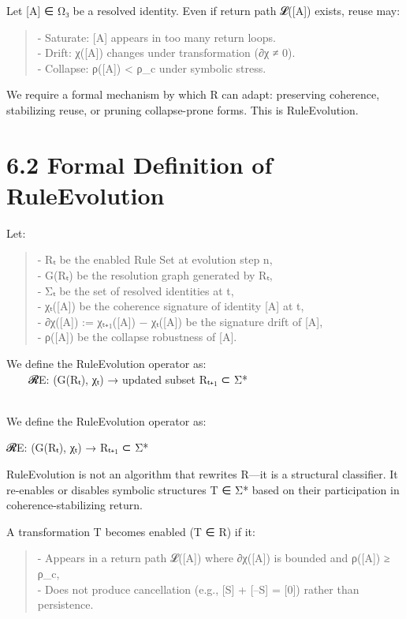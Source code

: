 Let {[}A{]} ∈ Ω₃ be a resolved identity. Even if return path 𝓛({[}A{]})
exists, reuse may:

\begin{quote}
- Saturate: {[}A{]} appears in too many return loops.\\
- Drift: χ({[}A{]}) changes under transformation (∂χ ≠ 0).\\
- Collapse: ρ({[}A{]}) \textless{} ρ\_c under symbolic stress.
\end{quote}

We require a formal mechanism by which R can adapt: preserving
coherence, stabilizing reuse, or pruning collapse-prone forms. This is
RuleEvolution.

\section{6.2 \textbar{} Formal Definition of
RuleEvolution}\label{formal-definition-of-ruleevolution}

Let:

\begin{quote}
- Rₜ be the enabled Rule Set at evolution step n,\\
- G(Rₜ) be the resolution graph generated by Rₜ,\\
- Σₜ be the set of resolved identities at t,\\
- χₜ({[}A{]}) be the coherence signature of identity {[}A{]} at t,\\
- ∂χ({[}A{]}) := χₜ₊₁({[}A{]}) − χₜ({[}A{]}) be the signature drift of
{[}A{]},\\
- ρ({[}A{]}) be the collapse robustness of {[}A{]}.
\end{quote}

We define the RuleEvolution operator as:\\
  𝓡E: (G(Rₜ), χₜ) → updated subset Rₜ₊₁ ⊂ Σ*\\
\strut \\
We define the RuleEvolution operator as:

𝓡E: (G(Rₜ), χₜ) → Rₜ₊₁ ⊂ Σ*

RuleEvolution is not an algorithm that rewrites R---it is a structural
classifier. It re-enables or disables symbolic structures T ∈ Σ* based
on their participation in coherence-stabilizing return.

A transformation T becomes enabled (T ∈ R) if it:

\begin{quote}
- Appears in a return path 𝓛({[}A{]}) where ∂χ({[}A{]}) is bounded and
ρ({[}A{]}) ≥ ρ\_c,\\
- Does not produce cancellation (e.g., {[}S{]} + {[}--S{]} = {[}0{]})
rather than persistence.
\end{quote}

